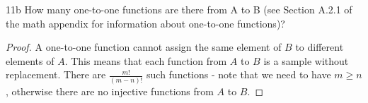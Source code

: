 \begin{exercise}{11b}
How many one-to-one functions are there from A to B (see Section A.2.1 of the
math appendix for information about one-to-one functions)?
\end{exercise}

\begin{proof}
    A one-to-one function cannot assign the same element of $B$ to different elements of $A$. This means that each function from $A$ to $B$ is a sample without replacement. There are $\frac{m!}{(m-n)!}$ such functions - note that we need to have $m \geq n$, otherwise there are no injective functions from $A$ to $B$.
\end{proof}


